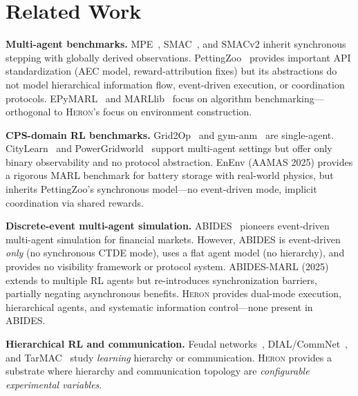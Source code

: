 \documentclass{article}
\newcommand{\heron}{\textsc{Heron}}
\begin{document}
\section{Related Work}
\label{sec:related}

\textbf{Multi-agent benchmarks.}
MPE~\cite{mordatch2018emergence}, SMAC~\cite{samvelyan2019starcraft}, and SMACv2 inherit synchronous stepping with globally derived observations. PettingZoo~\cite{terry2021pettingzoo} provides important API standardization (AEC model, reward-attribution fixes) but its abstractions do not model hierarchical information flow, event-driven execution, or coordination protocols. EPyMARL~\cite{papoudakis2021benchmarking} and MARLlib~\cite{hu2023marllib} focus on algorithm benchmarking---orthogonal to \heron{}'s focus on environment construction.

\textbf{CPS-domain RL benchmarks.}
Grid2Op~\cite{donnot2020introducing} and gym-anm~\cite{henry2021gym} are single-agent. CityLearn~\cite{vazquez2019citylearn} and PowerGridworld~\cite{biagioni2022powergridworld} support multi-agent settings but offer only binary observability and no protocol abstraction. EnEnv (AAMAS 2025) provides a rigorous MARL benchmark for battery storage with real-world physics, but inherits PettingZoo's synchronous model---no event-driven mode, implicit coordination via shared rewards.

\textbf{Discrete-event multi-agent simulation.}
ABIDES~\cite{byrd2020abides} pioneers event-driven multi-agent simulation for financial markets. However, ABIDES is event-driven \emph{only} (no synchronous CTDE mode), uses a flat agent model (no hierarchy), and provides no visibility framework or protocol system. ABIDES-MARL (2025) extends to multiple RL agents but re-introduces synchronization barriers, partially negating asynchronous benefits. \heron{} provides dual-mode execution, hierarchical agents, and systematic information control---none present in ABIDES.

\textbf{Hierarchical RL and communication.}
Feudal networks~\cite{vezhnevets2017feudal}, DIAL/CommNet~\cite{foerster2016learning}, and TarMAC~\cite{das2019tarmac} study \emph{learning} hierarchy or communication. \heron{} provides a substrate where hierarchy and communication topology are \emph{configurable experimental variables}.
\end{document}
